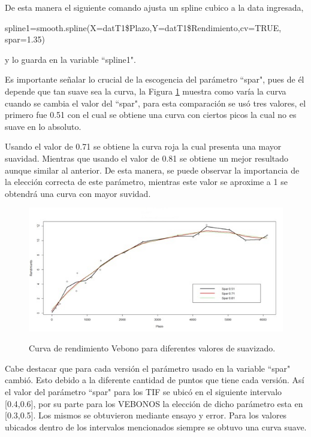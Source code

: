 \hspace{0.4cm} De esta manera el siguiente comando ajusta un spline cubico a la data ingresada,


spline1=smooth.spline(X=datT1\$Plazo,Y=datT1\$Rendimiento,cv=TRUE, spar=1.35)


\noindent y lo guarda en la variable ``spline1".

\hspace{0.4cm} Es importante se\~nalar lo crucial de la escogencia del par\'ametro ``spar", pues de \'el depende que tan suave sea la curva, la Figura \ref{comp_spar} muestra como var\'ia la curva cuando se cambia  el valor del ``spar", para esta comparaci\'on se us\'o tres valores, el primero fue 0.51 con el cual se obtiene una curva con ciertos picos la cual no es suave en lo absoluto. 

\newpage

\hspace{0.4cm} Usando el valor de 0.71 se obtiene la curva roja la cual presenta una mayor suavidad. Mientras que usando el valor de 0.81 se obtiene un mejor resultado aunque similar al anterior. De esta manera, se puede observar la importancia de la elecci\'on correcta de este par\'ametro, mientras este valor se aproxime a 1 se obtendr\'a una curva con mayor suvidad.

\begin{figure}[h]
  {\includegraphics{images/curvavbv2.jpg}}
\caption{Curva de rendimiento Vebono para diferentes valores de suavizado.}
\label{comp_spar}
\end{figure}

\hspace{0.4cm} Cabe destacar que para cada versi\'on el par\'ametro usado en la variable ``spar" \hspace{0.2cm} cambi\'o. Esto debido a la diferente cantidad de puntos que tiene cada versi\'on. As\'i el valor del par\'ametro ``spar" \hspace{0.2cm} para los TIF se ubic\'o en el siguiente intervalo [0.4,0.6], por su parte para los VEBONOS la elecci\'on de dicho par\'ametro esta en [0.3,0.5]. Los mismos se obtuvieron mediante ensayo y error. Para los valores ubicados dentro de los intervalos mencionados siempre se obtuvo una curva suave.

